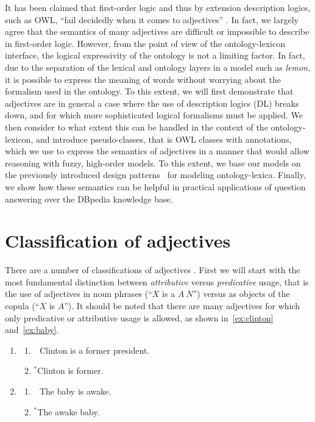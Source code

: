 \documentclass[11pt]{article}
\begin{document}
It has been claimed that first-order logic and thus by extension description 
logics, such as OWL, ``fail decidedly when it comes to adjectives''
\cite{bankston2003modeling}. In fact, we largely agree that the semantics 
of many adjectives are difficult or impossible to describe in first-order logic. 
However, from the point of view of the ontology-lexicon interface, the logical 
expressivity of the ontology is not a limiting factor. In fact, due to the 
separation of the lexical and ontology layers in a model such as \emph{lemon}, 
it is possible to express the meaning of words without worrying about the 
formalism used in the ontology. To this extent, we will first demonstrate that 
adjectives are in general a case where the use of description logics (DL) breaks down, 
and for which more sophisticated logical formalisms must be applied. We then 
consider to what extent this can be handled in the context of the 
ontology-lexicon, and introduce pseudo-classes, that is OWL classes with 
annotations, which we use to express the semantics of adjectives in a manner
that would allow reasoning with fuzzy, high-order models. To this extent, we base
our models on the previously introduced design patterns~\cite{mccrae2014design}
for modeling ontology-lexica. 
Finally, we show how these semantics can be helpful in practical applications 
of question answering over the DBpedia knowledge base.

\section{Classification of adjectives}

There are a number of classifications of adjectives \cite{}. First we will start 
with the most fundamental distinction between \emph{attributive} versus 
\emph{predicative} usage, that is the use of adjectives in noun phrases 
(``$X$ is a $A~N$'') versus as objects of the copula (``$X$ is $A$''). 
It should be noted that there are many adjectives for which only predicative or 
attributive usage is allowed, as shown in~\ref{ex:clinton} and~\ref{ex:baby}.

\begin{enumerate}[resume]
\item \begin{enumerate}	
\item \ \,Clinton is a former president.
\item $^*$Clinton is former.
\end{enumerate}
\label{ex:clinton}
\item \begin{enumerate}	
\item \ \,The baby is awake.
\item $^*$The awake baby.
\end{enumerate}
\label{ex:baby}
\end{enumerate}
\end{document}
